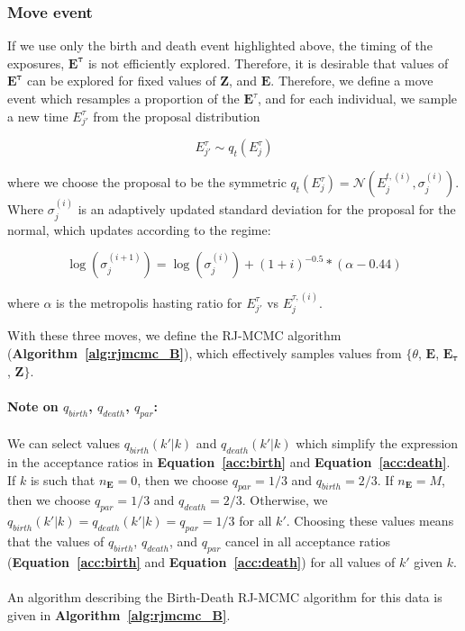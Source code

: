 \subsubsection{Move event}

If we use only the birth and death event highlighted above, the timing of the exposures, $\mathbf{E^\tau}$ is not efficiently explored.\cite{Gibson1998-re} Therefore, it is desirable that values of $\mathbf{E^\tau}$ can be explored for fixed values of $\mathbf{Z}$, and $\mathbf{E}$. Therefore, we define a move event which resamples a proportion of the $\mathbf{E}^{\tau}$, and for each individual, we sample a new time $E_{j'}^\tau$ from the proposal distribution

$$E_{j'}^{\tau} \sim q_t(E_{j}^{\tau}) $$

where we choose the proposal to be the symmetric $q_t(E_{j}^{\tau}) = \mathcal{N}(E_j^{t, (i)}, \sigma^{(i)}_j)$.  Where $\sigma^{(i)}_j$ is an adaptively updated standard deviation for the proposal for the normal, which updates according to the regime:

$$\log\left(\sigma^{(i + 1)}_j\right) = \log\left(\sigma^{(i)}_j\right) +  (1 + i)^{-0.5}*(\alpha - 0.44) $$

where $\alpha$ is the metropolis hasting ratio for $E_{j'}^{\tau}$ vs $E_j^{\tau, (i)}$.

With these three moves, we define the RJ-MCMC algorithm (\textbf{Algorithm~\ref{alg:rjmcmc_B}}), which effectively samples values from $\{\theta$, $\mathbf{E}$, $\mathbf{E_\tau}$, $\mathbf{Z}\}$. 


\paragraph{Note on $q_{birth}$, $q_{death}$, $q_{par}$:} We can select values $q_{birth}(k' | k)$ and $q_{death}(k' | k)$ which simplify the expression in the acceptance ratios in \textbf{Equation~\ref{acc:birth}} and \textbf{Equation~\ref{acc:death}}. If $k$ is such that $n_{\mathbf{E}} = 0$, then we choose $q_{par} = 1/3$ and $q_{birth} = 2/3$. If  $n_{\mathbf{E}} = M$, then we choose $q_{par} = 1/3$ and $q_{death} = 2/3$. Otherwise, we  $q_{birth}(k' | k) = q_{death}(k' | k) = q_{par} = 1/3$ for all $k'$. Choosing these values means that the values of $q_{birth}$, $q_{death}$, and $q_{par}$ cancel in all acceptance ratios (\textbf{Equation~\ref{acc:birth}} and \textbf{Equation~\ref{acc:death}}) for all values of $k'$ given $k$.

\paragraph{} An algorithm describing the Birth-Death RJ-MCMC algorithm for this data is given in \textbf{Algorithm~\ref{alg:rjmcmc_B}}.


